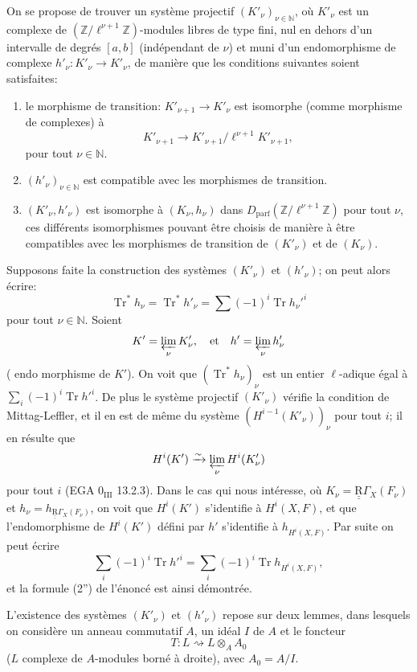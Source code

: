 \documentclass[11pt]{article}
\providecommand{\Tr}{\operatorname{Tr}}
\providecommand{\Tr}{\operatorname{Tr}}
\providecommand{\Tr}{\operatorname{Tr}}
\providecommand{\Tr}{\operatorname{Tr}}
\providecommand{\Tr}{\operatorname{Tr}}
\begin{document}
On se propose de trouver un système projectif $(K'_\nu)_{\nu\in\mathbb N}$, où $K'_\nu$ est un complexe de $(\mathbb Z/\ell^{\nu+1}\mathbb Z)$-modules libres de type fini, nul en dehors d'un intervalle de degrés $[a,b]$ (indépendant de $\nu$) et muni d'un endomorphisme de complexe $h'_\nu:K'_\nu\to K'_\nu$, de manière que les conditions suivantes soient satisfaites:
\begin{enumerate}[label=\arabic*)]
\item le morphisme de transition: $K'_{\nu+1}\to K'_\nu$ est isomorphe (comme morphisme de complexes) à
\[
K'_{\nu+1}\to K'_{\nu+1}/\ell^{\nu+1}K'_{\nu+1},
\]
pour tout $\nu\in\mathbb N$.
\item $(h'_\nu)_{\nu\in\mathbb N}$ est compatible avec les morphismes de transition.
\item $(K'_\nu,h'_\nu)$ est isomorphe à $(K_\nu,h_\nu)$ dans $D_{\mathrm{parf}}(\mathbb Z/\ell^{\nu+1}\mathbb Z)$ pour tout $\nu$, ces différents isomorphismes pouvant être choisis de manière à être compatibles avec les morphismes de transition de $(K'_\nu)$ et de $(K_\nu)$.
\end{enumerate}
Supposons faite la construction des systèmes $(K'_\nu)$ et $(h'_\nu)$; on peut alors écrire:
\[
\Tr^*h_\nu=\Tr^*h'_\nu=\sum(-1)^i\Tr h_\nu'^i
\]
pour tout $\nu\in\mathbb N$. Soient
\[
K'=\varprojlim_\nu K'_\nu,
\quad\text{et}\quad h'=\varprojlim_\nu h'_\nu
\]
(
endo%
morphisme de $K'$). On voit que $(\Tr^*h_\nu)_\nu$ est un entier $\ell$-adique égal à $\sum_i(-1)^i\Tr h'^i$. De plus le système projectif $(K'_\nu)$ vérifie la condition de Mittag-Leffler, et il en est de même du système $(H^{i-1}(K'_\nu))_\nu$ pour tout $i$; il en résulte que
\[
H^i(K')\xrightarrow{\sim}\varprojlim_\nu H^i(K'_\nu)
\]
pour tout $i$ (EGA $0_{\mathrm{III}}$ 13.2.3). Dans le cas qui nous intéresse, où $K_\nu=\underline{\underline{\mathrm{R}}}\Gamma_X(F_\nu)$ et $h_\nu=h_{\underline{\underline{\mathrm{R}}}\Gamma_X(F_\nu)}$, on voit que $H^i(K')$ s'identifie à $H^i(X,F)$, et que l'endomorphisme de $H^i(K')$ défini par $h'$ s'identifie à $h_{H^i(X,F)}$. Par suite on peut écrire
\[
\sum_i(-1)^i\Tr h'^i=
\sum_i(-1)^i\Tr h_{H^i(X,F)},
\]
et la formule (2'') de l'énoncé est ainsi démontrée.

L'existence des systèmes $(K'_\nu)$ et $(h'_\nu)$ repose sur deux lemmes, dans lesquels on considère un anneau commutatif $A$, un idéal $I$ de $A$ et le foncteur
\[
T:L\rightsquigarrow L\otimes_A A_0
\]
($L$ complexe de $A$-modules borné à droite), avec $A_0=A/I$.
\end{document}

